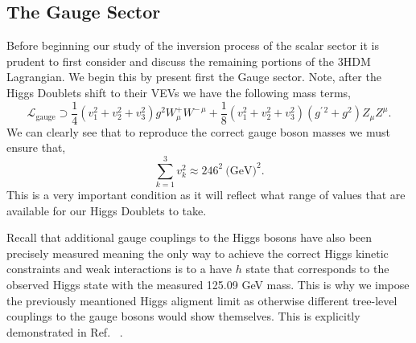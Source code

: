 % 
%

\subsection{The Gauge Sector}

Before beginning our study of the inversion process of the scalar sector it is prudent to first consider and discuss the remaining portions of the 3HDM Lagrangian. 
%
We begin this by present first the Gauge sector. 
%
Note, after the Higgs Doublets shift to their VEVs we have the following mass terms, 
%
\begin{equation}
\mathcal{L}_{\text{gauge}} \supset \frac{1}{4} \left( v_1^2 + v_2^2  + v_3^2 \right) g^2 W^+_\mu W^{-\,\mu} + \frac{1}{8} \left(  v_1^2 + v_2^2  + v_3^2  \right) \left( g^{\prime \, 2} + g^2 \right) Z_\mu Z^\mu  .
\end{equation}
%
We can clearly see that to reproduce the correct gauge boson masses we must ensure that,
%
\begin{equation}
\label{eq:VEV_Condition}
\sum_{k=1}^3 v_k^2 \approx 246^2 \ \text{(GeV)}^2  . 
\end{equation}
%
This is a very important condition as it will reflect what range of values that are available for our Higgs Doublets to take.

Recall that additional gauge couplings to the Higgs bosons have also been precisely measured meaning the only way to achieve the correct Higgs kinetic constraints and weak interactions is to a have $h$ state that corresponds to the observed Higgs state with the measured 125.09 GeV mass. 
%
This is why we impose the previously meantioned Higgs aligment limit as otherwise different tree-level couplings to the gauge bosons would show themselves. 
%
This is explicitly demonstrated in Ref.~\cite{das2015implications} . 

